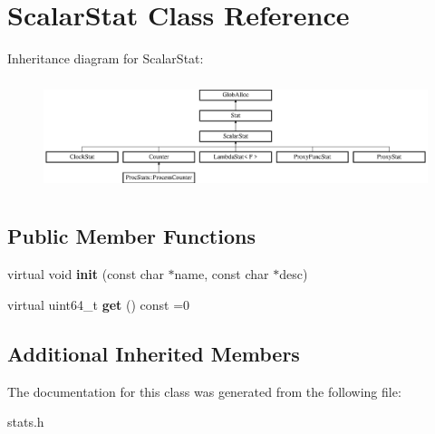 \hypertarget{classScalarStat}{\section{Scalar\-Stat Class Reference}
\label{classScalarStat}
}
Inheritance diagram for Scalar\-Stat\-:\begin{figure}[H]
\begin{center}
\leavevmode
\includegraphics[height=3.274854cm]{classScalarStat}
\end{center}
\end{figure}
\subsection*{Public Member Functions}
\begin{DoxyCompactItemize}
\item 
\hypertarget{classScalarStat_ad144d5707035ec9e4e027a4a05461bdc}{virtual void {\bfseries init} (const char $\ast$name, const char $\ast$desc)}\label{classScalarStat_ad144d5707035ec9e4e027a4a05461bdc}

\item 
\hypertarget{classScalarStat_af0769ffb26acb180dfaebfe736f2b1fa}{virtual uint64\-\_\-t {\bfseries get} () const =0}\label{classScalarStat_af0769ffb26acb180dfaebfe736f2b1fa}

\end{DoxyCompactItemize}
\subsection*{Additional Inherited Members}


The documentation for this class was generated from the following file\-:\begin{DoxyCompactItemize}
\item 
stats.\-h\end{DoxyCompactItemize}
